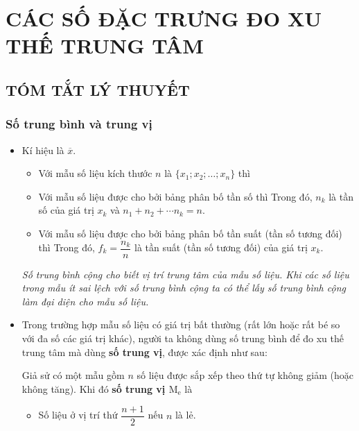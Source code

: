 \section{CÁC SỐ ĐẶC TRƯNG ĐO XU THẾ TRUNG TÂM}
\subsection{TÓM TẮT LÝ THUYẾT}
\subsubsection{Số trung bình và trung vị}
\begin{itemize}
	\item [\iconMT]  Kí hiệu là $\overline{x}$.
	\begin{tcolorbox}[colframe=orange,colback=white,boxrule=0.2mm]
		\begin{itemize}
			\item Với mẫu số liệu kích thước $n$ là $\{x_1; x_2;\ldots; x_{n}\}$ thì 
			\item Với mẫu số liệu được cho bởi bảng phân bố tần số thì 
			Trong đó, $n_k$ là tần số của giá trị $x_k$ và $n_1+n_2+\cdots n_k=n$.
			\item Với mẫu số liệu được cho bởi bảng phân bố tần suất (tần số tương đối) thì
			Trong đó, $f_k=\dfrac{n_k}{n}$ là tần suất (tần số tương đối) của giá trị $x_k$.
		\end{itemize}
	\end{tcolorbox}
	\textit{ Số trung bình cộng cho biết vị trí trung tâm của mẫu số liệu. Khi các số liệu trong mẫu ít sai lệch với số trung bình cộng ta có thể lấy số trung bình cộng làm đại diện cho mẫu số liệu.}
	\item [\iconMT]  Trong trường hợp mẫu số liệu có giá trị bất thường (rất lớn hoặc rất bé so với đa số các giá trị khác), người ta không dùng số trung bình để đo xu thế trung tâm mà dùng \textbf{số trung vị}, được xác định như sau:
	\begin{tcolorbox}[colframe=orange,colback=white,boxrule=0.2mm]
			Giả sử có một mẫu gồm $n$ số liệu được sắp xếp theo thứ tự không giảm (hoặc không tăng). Khi đó \textbf{số trung vị $\mathrm{M_e}$} là
		\begin{itemize}
			\item Số liệu ở vị trí thứ $\dfrac{n+1}{2}$ nếu $n$ là lẻ.

\end{itemize}
\end{tcolorbox}
\end{itemize}
